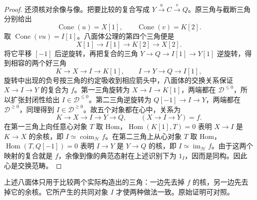 \begin{proof}
	还须核对余像与像。把要比较的复合写成 \(Y\xrightarrow{u}C\xrightarrow{v}Q\)。原三角与截断三角分别给出
	\[
		\operatorname{Cone}(u)=X[1],\qquad \operatorname{Cone}(v)=K[2].
	\]
	取 \(\operatorname{Cone}(vu)=I[1]\)。八面体公理的第四个三角便是
	\[
		X[1]\longrightarrow I[1]\longrightarrow K[2]\longrightarrow X[2].
	\]
	将它平移 \([-1]\) 后逆旋转，再把复合的三角 \(Y\to Q\to I[1]\to Y[1]\) 逆旋转，得到相容的两个好三角
	\[
		K\longrightarrow X\longrightarrow I\longrightarrow K[1], \qquad I\longrightarrow Y\longrightarrow Q\longrightarrow I[1],
	\]
	旋转中出现的负号按三角的约定吸收到相应箭头中，八面体的交换关系保证 \(X\to I\to Y\) 的复合为 \(f\)。第一三角旋转为 \(X\to I\to K[1]\)，两端都在 \(\mathcal D^{\le0}\)，所以扩张封闭性给出 \(I\in\mathcal D^{\le0}\)。第二三角逆旋转为 \(Q[-1]\to I\to Y\)，两端都在 \(\mathcal D^{\ge0}\)，同理得到 \(I\in\mathcal D^{\ge0}\)。故五个对象都在心中，关系为
	\[
		K\longrightarrow X\longrightarrow I\longrightarrow Y\longrightarrow Q, \qquad (X\longrightarrow I\longrightarrow Y)=f.
	\]
	在第一三角上向任意心对象 \(T\) 取 Hom，\(\operatorname{Hom}(K[1],T)=0\) 表明 \(X\to I\) 是 \(K\to X\) 的余核，即 \(I\simeq\operatorname{coim}_{\mathcal H}f\)。在第二三角上从心对象 \(T\) 取 Hom，\(\operatorname{Hom}(T,Q[-1])=0\) 表明 \(I\to Y\) 是 \(Y\to Q\) 的核，即 \(I\simeq\operatorname{im}_{\mathcal H}f\)。由于这两个映射的复合就是 \(f\)，余像到像的典范态射在上述识别下为 \(1_I\)，因而是同构。因此心是交换范畴。
\end{proof}

上述八面体只用于比较两个实际构造出的三角：一边先去掉 \(f\) 的核，另一边先去掉它的余核。它所产生的共同对象 \(I\) 才使两种做法一致。原始证明可对照\cite[Proposition 1.2.4; Théorème 1.3.6]{BBD1982FaisceauxPervers}。

